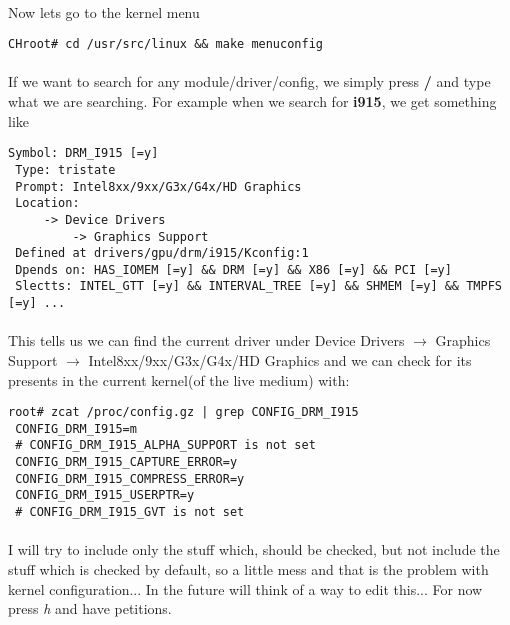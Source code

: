 \documentclass[10pt,a4paper]{article}
\begin{document}
                \paragraph{} Now lets go to the kernel menu

                \begin{lstlisting}[style=BashInputCHRoot]
 CHroot# cd /usr/src/linux && make menuconfig
                \end{lstlisting}

                \paragraph{} If we want to search for any module/driver/config, we simply press \textbf{/} and type what we are searching. For example when we search for \textbf{i915}, we get something like

                \begin{lstlisting}[style=KernelConfig]
 Symbol: DRM_I915 [=y]
 Type: tristate
 Prompt: Intel8xx/9xx/G3x/G4x/HD Graphics
 Location:
     -> Device Drivers
         -> Graphics Support
 Defined at drivers/gpu/drm/i915/Kconfig:1
 Dpends on: HAS_IOMEM [=y] && DRM [=y] && X86 [=y] && PCI [=y]
 Slectts: INTEL_GTT [=y] && INTERVAL_TREE [=y] && SHMEM [=y] && TMPFS [=y] ...
                \end{lstlisting}

                \paragraph{} This tells us we can find the current driver under Device Drivers $ \rightarrow $ Graphics Support $ \rightarrow $ Intel8xx/9xx/G3x/G4x/HD Graphics and we can check for its presents in the current kernel(of the live medium) with:

                \begin{lstlisting}[style=BashInputRoot]
root# zcat /proc/config.gz | grep CONFIG_DRM_I915
 CONFIG_DRM_I915=m
 # CONFIG_DRM_I915_ALPHA_SUPPORT is not set
 CONFIG_DRM_I915_CAPTURE_ERROR=y
 CONFIG_DRM_I915_COMPRESS_ERROR=y
 CONFIG_DRM_I915_USERPTR=y
 # CONFIG_DRM_I915_GVT is not set
                \end{lstlisting}

                \paragraph{} I will try to include only the stuff which, should be checked, but not include the stuff which is checked by default, so a little mess and that is the problem with kernel configuration... In the future will think of a way to edit this... For now press \textit{h} and have petitions.
\end{document}
